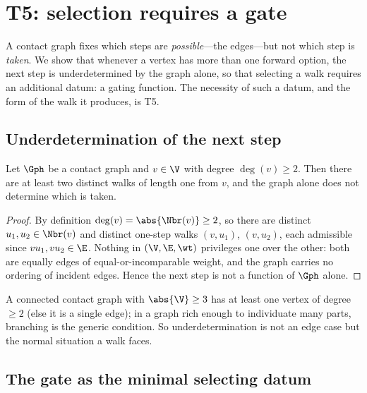
\section{T5: selection requires a gate}
\label{sec:gating}

A contact graph fixes which steps are \emph{possible}---the edges---but not which
step is \emph{taken}. We show that whenever a vertex has more than one forward
option, the next step is underdetermined by the graph alone, so that selecting a
walk requires an additional datum: a gating function. The necessity of such a
datum, and the form of the walk it produces, is T5.

\subsection{Underdetermination of the next step}

\begin{lemma}
\label{lem:branching}
Let $\Gph$ be a contact graph and $v\in\V$ with degree $\deg(v)\ge 2$. Then there
are at least two distinct walks of length one from $v$, and the graph alone does
not determine which is taken.
\end{lemma}

\begin{proof}
By definition $\deg(v)=\abs{\Nbr(v)}\ge2$, so there are distinct
$u_1,u_2\in\Nbr(v)$ and distinct one-step walks $(v,u_1)$, $(v,u_2)$, each
admissible since $vu_1,vu_2\in\E$. Nothing in $(\V,\E,\wt)$ privileges one over
the other: both are equally edges of equal-or-incomparable weight, and the graph
carries no ordering of incident edges. Hence the next step is not a function of
$\Gph$ alone.
\end{proof}

\begin{remark}
\label{rem:branch-generic}
A connected contact graph with $\abs{\V}\ge3$ has at least one vertex of degree
$\ge2$ \textup{(}else it is a single edge\textup{)}; in a graph rich enough to
individuate many parts, branching is the generic condition. So
underdetermination is not an edge case but the normal situation a walk faces.
\end{remark}

\subsection{The gate as the minimal selecting datum}

